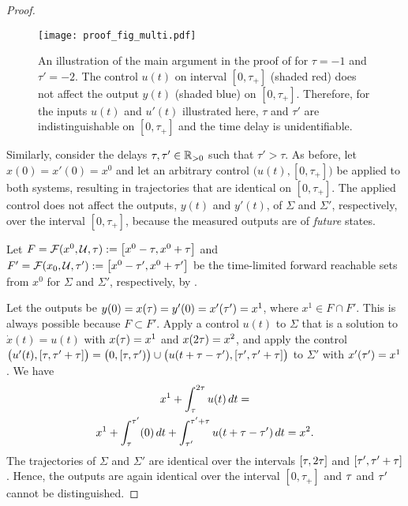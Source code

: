 \documentclass[letterpaper,10pt,conference]{ieeeconf}
\theoremstyle{definition}
\begin{document}
\begin{proof}
\begin{figure}[t]
\centering
\texttt{[image: proof\_fig\_multi.pdf]}
\vspace*{-8mm}
\caption{An illustration of the main argument in the proof of  for $\tau = -1$ and $\tau' = -2$. The control $u(t)$ on interval $[0, \tau_{+}]$ (shaded red) does not affect the output $y(t)$ (shaded blue) on $[0, \tau_{+}]$. Therefore, for the inputs $u(t)$ and $u'(t)$ illustrated here, $\tau$ and $\tau'$ are indistinguishable on $[0, \tau_{+}]$ and the time delay is unidentifiable.}\label{fig:proof_plot}
\vspace*{-4mm}
\end{figure}

Similarly, consider the delays $\tau, \tau' \in \mathbb{R}_{>0}$ such that $\tau' > \tau$.
%
As before, let $x(0) = x'(0) = x^{0}$ and let an arbitrary control 
$\big(u(t), [0, \tau_{+}]\big)$ be applied to both systems, resulting in trajectories that are identical on $[0, \tau_{+}]$.
%
The applied control does not affect the outputs, $y(t)$ and $y'(t)$, of $\Sigma$ and $\Sigma'$, respectively, over the interval $[0, \tau_{+}]$, because the measured outputs are of \emph{future} states.

Let $F = \mathcal{F}(x^{0}, \mathcal{U}, \tau) := \left[x^{0} - \tau, x^{0} + \tau\right]$ and $F' = \mathcal{F}(x_{0}, \mathcal{U}, \tau') := \left[x^{0} - \tau', x^{0} + \tau'\right]$ be the time-limited forward reachable sets from $x^{0}$ for $\Sigma$ and $\Sigma'$, respectively, by .

Let the outputs be $y(0) = x(\tau) = y'(0) = x'(\tau') = x^{1}$, where $x^{1} \in F \cap F'$.
%
This is always possible because $F \subset F'$.
%
Apply a control $u(t)$ to $\Sigma$ that is a solution to $\dot{x}(t) = u(t)$ with $x(\tau) = x^{1}$ and $x(2\tau) = x^{2}$, and apply the control 
$\big(u'(t), [\tau, \tau' + \tau]\big) = \big(0, [\tau, \tau')\big) \cup \big(u(t + \tau - \tau'), [\tau', \tau' + \tau]\big)$ to $\Sigma'$ with $x'(\tau') = x^{1}$.
%
We have
%
\begin{multline}
x^{1} + \int^{2\tau}_{\tau} u(t)\,dt = \\
x^{1} + \int^{\tau'}_{\tau} (0)\,dt + \int^{\tau' + \tau}_{\tau'} u(t + \tau - \tau')\,dt = x^{2}.
\end{multline}
%
The trajectories of $\Sigma$ and $\Sigma'$ are identical over the intervals $[\tau, 2\tau]$ and $[\tau', \tau' + \tau]$. Hence, the outputs are again identical over the interval $[0, \tau_{+}]$ and $\tau$ and $\tau'$ cannot be distinguished.
\end{proof}
\end{document}
